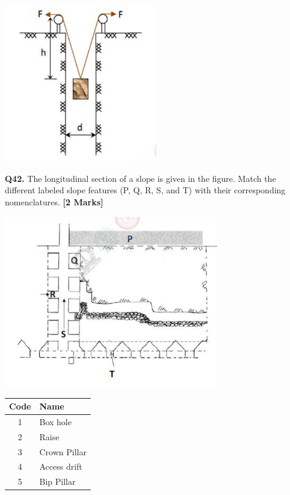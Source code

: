 \documentclass[11pt]{article}
\newcommand{\questionb}[2]{
    \noindent\textbf{Q#2.} #1 \hfill \textbf{[2 Marks]}
}
\begin{document}
\begin{center}
\includegraphics[width=0.5\textwidth]{figures/41.png}
\end{center}

\questionb{The longitudinal section of a slope is given in the figure. Match the different labeled slope features (P, Q, R, S, and T) with their corresponding nomenclatures.}{42}

\begin{center}
\includegraphics[width=0.7\textwidth]{figures/42.png}
\end{center}

\begin{center}
\begin{tabular}{|c|l|}
\hline
\textbf{Code} & \textbf{Name} \\
\hline
1 & Box hole \\
2 & Raise \\
3 & Crown Pillar \\
4 & Access drift \\
5 & Bip Pillar \\
\hline
\end{tabular}
\end{center}
\end{document}
